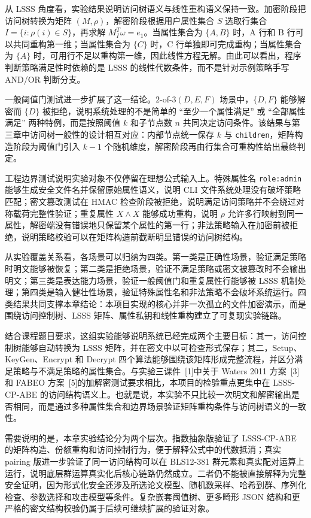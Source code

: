 从 LSSS 角度看，实验结果说明访问树语义与线性重构语义保持一致。加密阶段把访问树转换为矩阵 $(M,\rho)$，解密阶段根据用户属性集合 $S$ 选取行集合 $I=\{i:\rho(i)\in S\}$，再求解 $M_I^T\omega=e_1$。当属性集合为 $\{A,B\}$ 时，A 行和 B 行可以共同重构第一维；当属性集合为 $\{C\}$ 时，C 行单独即可完成重构；当属性集合为 $\{A\}$ 时，可用行不足以重构第一维，因此线性方程无解。由此可以看出，程序判断策略满足性时依赖的是 LSSS 的线性代数条件，而不是针对示例策略手写 AND/OR 判断分支。

一般阈值门测试进一步扩展了这一结论。$2$-of-$3(D,E,F)$ 场景中，$\{D,F\}$ 能够解密而 $\{D\}$ 被拒绝，说明系统处理的不是简单的 ``至少一个属性满足'' 或 ``全部属性满足'' 两种特例，而是按照阈值 $k$ 和子节点数 $n$ 共同决定访问条件。该结果与第三章中访问树一般性的设计相互对应：内部节点统一保存 $k$ 与 \verb|children|，矩阵构造阶段为阈值门引入 $k-1$ 个随机维度，解密阶段再由行集合可重构性给出最终判定。

工程边界测试说明实验对象不仅停留在理想公式输入上。特殊属性名 \verb|role:admin| 能够生成安全文件名并保留原始属性语义，说明 CLI 文件系统处理没有破坏策略匹配；密文篡改测试在 HMAC 检查阶段被拒绝，说明满足访问策略并不会绕过对称载荷完整性验证；重复属性 $X\wedge X$ 能够成功重构，说明 $\rho$ 允许多行映射到同一属性，解密端没有错误地只保留某个属性的第一行；非法策略输入在加密前被拒绝，说明策略校验可以在矩阵构造前截断明显错误的访问树结构。

从实验覆盖关系看，各场景可以归纳为四类。第一类是正确性场景，验证满足策略时明文能够被恢复；第二类是拒绝场景，验证不满足策略或密文被篡改时不会输出明文；第三类是表达能力场景，验证一般阈值门和重复属性行能够被 LSSS 机制处理；第四类是输入健壮性场景，验证特殊属性名和非法策略不会破坏系统运行。四类结果共同支撑本章结论：本项目实现的核心并非一次孤立的文件加密演示，而是围绕访问控制树、LSSS 矩阵、属性私钥和线性重构建立了可复现实验链路。

结合课程题目要求，这组实验能够说明系统已经完成两个主要目标：其一，访问控制树能够自动转换为 LSSS 矩阵，并在密文中以可检查形式保存；其二，Setup、KeyGen、Encrypt 和 Decrypt 四个算法能够围绕该矩阵形成完整流程，并区分满足策略与不满足策略的属性集合。与实验三课件~[1]中关于 Waters 2011 方案~[3]和 FABEO 方案~[5]的加解密测试要求相比，本项目的检验重点更集中在 LSSS-CP-ABE 的访问结构语义上。也就是说，本实验不只比较一次明文和解密输出是否相同，而是通过多种属性集合和边界场景验证矩阵重构条件与访问树语义的一致性。

需要说明的是，本章实验结论分为两个层次。指数抽象版验证了 LSSS-CP-ABE 的矩阵构造、份额重构和访问控制行为，便于解释公式中的代数抵消；真实 pairing 版进一步验证了同一访问结构可以在 BLS12-381 群元素和真实配对运算上运行，说明底层群运算真实化后核心链路仍然成立。二者仍不能被直接解释为完整安全证明，因为形式化安全还涉及所选论文模型、随机数采样、哈希到群、序列化检查、参数选择和攻击模型等条件。复杂嵌套阈值树、更多畸形 JSON 结构和更严格的密文结构校验仍属于后续可继续扩展的验证对象。

